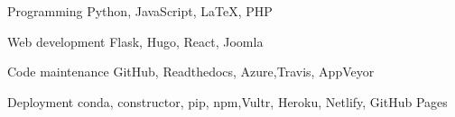 \begin{minipage}[t]{0.5\textwidth}
\begin{cvskills}

  \cvskill
    {Programming} %
    {Python, JavaScript, LaTeX, PHP} %

  \cvskill
    {Web development} %
    {Flask, Hugo, React, Joomla} %

  \cvskill
    {Code maintenance} %
    {GitHub, Readthedocs, Azure,\newline Travis, AppVeyor} %

  \cvskill
    {Deployment} %
    {conda, constructor, pip, npm,\newline Vultr, Heroku, Netlify, GitHub Pages} %

\end{cvskills}
\end{minipage}
\begin{minipage}[t]{0.5\textwidth}


\begin{cvskills}



\end{cvskills}
\end{minipage}
